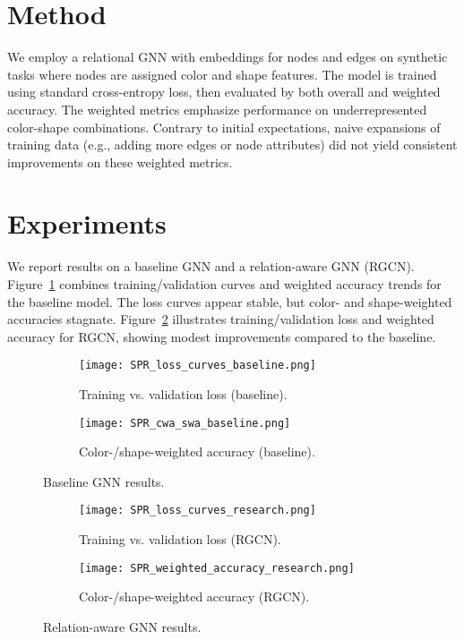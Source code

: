 \documentclass{article}
\begin{document}
\section{Method}
We employ a relational GNN with embeddings for nodes and edges on synthetic tasks where nodes are assigned color and shape features. The model is trained using standard cross-entropy loss, then evaluated by both overall and weighted accuracy. The weighted metrics emphasize performance on underrepresented color-shape combinations. Contrary to initial expectations, naive expansions of training data (e.g., adding more edges or node attributes) did not yield consistent improvements on these weighted metrics.

\section{Experiments}
We report results on a baseline GNN and a relation-aware GNN (RGCN). Figure~\ref{fig:baselines} combines training/validation curves and weighted accuracy trends for the baseline model. The loss curves appear stable, but color- and shape-weighted accuracies stagnate. Figure~\ref{fig:rgcn} illustrates training/validation loss and weighted accuracy for RGCN, showing modest improvements compared to the baseline.

\begin{figure}[t]
  \centering
  \begin{subfigure}[b]{0.45\linewidth}
    \texttt{[image: SPR\_loss\_curves\_baseline.png]}
    \caption{Training vs. validation loss (baseline).}
  \end{subfigure}
  \quad
  \begin{subfigure}[b]{0.45\linewidth}
    \texttt{[image: SPR\_cwa\_swa\_baseline.png]}
    \caption{Color-/shape-weighted accuracy (baseline).}
  \end{subfigure}
  \caption{Baseline GNN results.\label{fig:baselines}}
\end{figure}

\begin{figure}[t]
  \centering
  \begin{subfigure}[b]{0.45\linewidth}
    \texttt{[image: SPR\_loss\_curves\_research.png]}
    \caption{Training vs. validation loss (RGCN).}
  \end{subfigure}
  \quad
  \begin{subfigure}[b]{0.45\linewidth}
    \texttt{[image: SPR\_weighted\_accuracy\_research.png]}
    \caption{Color-/shape-weighted accuracy (RGCN).}
  \end{subfigure}
  \caption{Relation-aware GNN results.\label{fig:rgcn}}
\end{figure}
\end{document}
